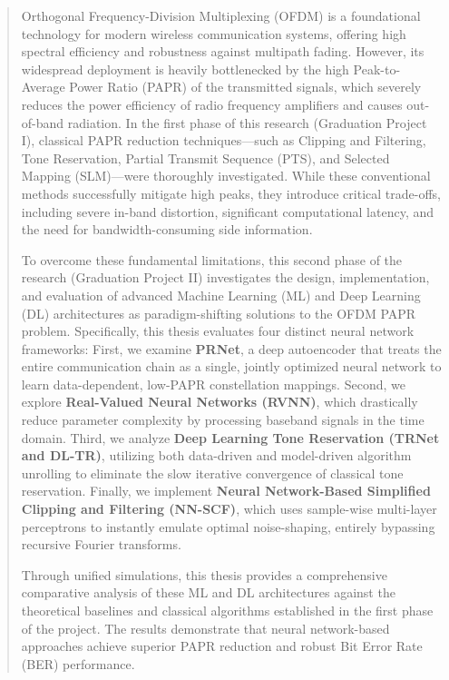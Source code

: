 \documentclass[11pt, a4paper, twoside, openright]{book}
\begin{document}
\begin{abstract}
    Orthogonal Frequency-Division Multiplexing (OFDM) is a foundational technology for modern wireless communication systems, offering high spectral efficiency and robustness against multipath fading. However, its widespread deployment is heavily bottlenecked by the high Peak-to-Average Power Ratio (PAPR) of the transmitted signals, which severely reduces the power efficiency of radio frequency amplifiers and causes out-of-band radiation. In the first phase of this research (Graduation Project I), classical PAPR reduction techniques—such as Clipping and Filtering, Tone Reservation, Partial Transmit Sequence (PTS), and Selected Mapping (SLM)—were thoroughly investigated. While these conventional methods successfully mitigate high peaks, they introduce critical trade-offs, including severe in-band distortion, significant computational latency, and the need for bandwidth-consuming side information.

    To overcome these fundamental limitations, this second phase of the research (Graduation Project II) investigates the design, implementation, and evaluation of advanced Machine Learning (ML) and Deep Learning (DL) architectures as paradigm-shifting solutions to the OFDM PAPR problem. Specifically, this thesis evaluates four distinct neural network frameworks: First, we examine \textbf{PRNet}, a deep autoencoder that treats the entire communication chain as a single, jointly optimized neural network to learn data-dependent, low-PAPR constellation mappings. Second, we explore \textbf{Real-Valued Neural Networks (RVNN)}, which drastically reduce parameter complexity by processing baseband signals in the time domain. Third, we analyze \textbf{Deep Learning Tone Reservation (TRNet and DL-TR)}, utilizing both data-driven and model-driven algorithm unrolling to eliminate the slow iterative convergence of classical tone reservation. Finally, we implement \textbf{Neural Network-Based Simplified Clipping and Filtering (NN-SCF)}, which uses sample-wise multi-layer perceptrons to instantly emulate optimal noise-shaping, entirely bypassing recursive Fourier transforms.

    Through unified simulations, this thesis provides a comprehensive comparative analysis of these ML and DL architectures against the theoretical baselines and classical algorithms established in the first phase of the project. The results demonstrate that neural network-based approaches achieve superior PAPR reduction and robust Bit Error Rate (BER) performance.
\end{abstract}
\end{document}
